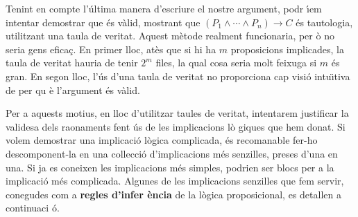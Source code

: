 \bigskip

Tenint en compte l'\'{u}ltima manera d'escriure el nostre argument, podr%
\'{\i}em intentar demostrar que \'{e}s v\`{a}lid, mostrant que $\left(
P_{1}\wedge\cdots\wedge P_{n}\right) \longrightarrow C$ \'{e}s tautologia,
utilitzant una taula de veritat. Aquest m\`{e}tode realment funcionaria, per%
\`{o} no seria gens efica\c{c}. En primer lloc, at\`{e}s que si hi ha $m$
proposicions implicades, la taula de veritat hauria de tenir $2^{m}$ files,
la qual cosa seria molt feixuga si $m$ \'{e}s gran. En segon lloc, l'\'{u}s
d'una taula de veritat no proporciona cap visi\'{o} intu\"{\i}tiva de per qu%
\`{e} l'argument \'{e}s v\`{a}lid.

Per a aquests motius, en lloc d'utilitzar taules de veritat, intentarem
justificar la validesa dels raonaments fent \'{u}s de les implicacions l\`{o}%
giques que hem donat. Si volem demostrar una implicaci\'{o} l\`{o}gica
complicada, \'{e}s recomanable fer-ho descomponent-la en una
col\textperiodcentered lecci\'{o} d'implicacions m\'{e}s senzilles, preses
d'una en una. Si ja es coneixen les implicacions m\'{e}s simples, podrien
ser blocs per a la implicaci\'{o} m\'{e}s complicada. Algunes de les
implicacions senzilles que fem servir, conegudes com a \textbf{regles d'infer%
\`{e}ncia} \label{5} de la l\`{o}gica proposicional, es detallen a continuaci%
\'{o}.

\bigskip

